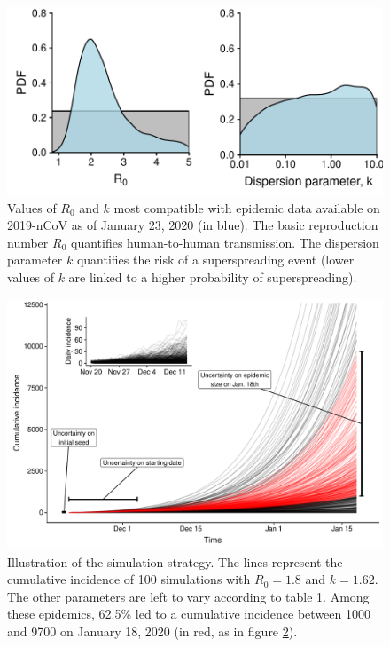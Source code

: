 \documentclass{article}
\begin{document}
\begin{figure}[h]
	\centering
	\includegraphics[width=.6\linewidth]{../figure/fig2.pdf}
	\caption{Values of $R_0$ and $k$ most compatible with epidemic data available on 2019-nCoV as of January 23, 2020 (in blue). The basic reproduction number $R_0$ quantifies human-to-human transmission. The dispersion parameter $k$ quantifies the risk of a superspreading event (lower values of $k$ are linked to a higher probability of superspreading).}
	\label{fig:fig2}
\end{figure}


\begin{figure}[h]
	\centering
	\includegraphics[width=.9\linewidth]{../figure/fig3b.pdf}
	\caption{Illustration of the simulation strategy. The lines represent the cumulative incidence of 100 simulations with $R_0=1.8$ and $k=1.62$. The other parameters are left to vary according to table 1. Among these epidemics, 62.5\% led to a cumulative incidence between 1000 and 9700 on January 18, 2020 (in red, as in figure \ref{fig:fig3}).}
	\label{fig:fig3}
\end{figure}
\end{document}
